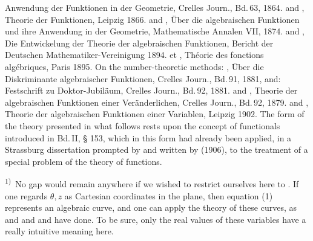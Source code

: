 \noindent Anwendung der  Funktionen in der Geometrie, Crelles
Journ., Bd.\,63, 1864.  and ,
Theorie der  Funktionen, Leipzig 1866.  and
, Über die algebraischen Funktionen und ihre
Anwendung in der Geometrie, Mathematische Annalen VII, 1874.
 and , Die Entwickelung der Theorie
der algebraischen Funktionen, Bericht der Deutschen
Mathematiker-Vereinigung 1894.  et ,
Théorie des fonctions algébriques, Paris 1895. On the
number-theoretic methods: , Über die
Diskriminante algebraischer Funktionen, Crelles Journ., Bd.\,91, 1881,
and: Festschrift zu  Doktor-Jubiläum, Crelles
Journ., Bd.\,92, 1881.  and ,
Theorie der algebraischen Funktionen einer Veränderlichen, Crelles
Journ., Bd.\,92, 1879.  and ,
Theorie der algebraischen Funktionen einer Variablen, Leipzig 1902.
The form of the theory presented in what follows rests upon the concept
of functionals introduced in Bd.\,II, § 153, which in this form had
already been applied, in a Strassburg dissertation prompted by
 and written by  (1906), to the
treatment of a special problem of the theory of functions.

\smallskip
\noindent\textsuperscript{1)}~No gap would remain anywhere if we wished
to restrict ourselves here to . If one regards
$\theta, z$ as Cartesian coordinates in the plane, then equation (1)
represents an algebraic curve, and one can apply the theory of these
curves, as  and  and 
and  have done. To be sure, only the real values of
these variables have a really intuitive meaning here.
